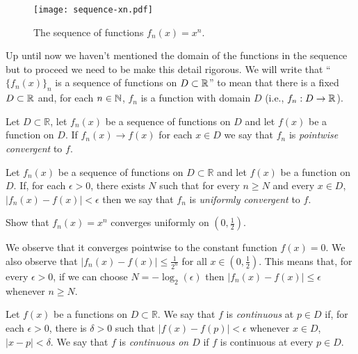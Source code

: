 \begin{figure}
  \begin{center}
    \texttt{[image: sequence-xn.pdf]}
    \caption{The sequence of functions \(f_n(x)= x^n\).}
  \end{center}
\end{figure}

\noindent
Up until now we haven't mentioned the domain of the functions in the sequence but to proceed we need to be make this detail rigorous.
We will write that ``\({\{f_n(x)\}}_{n}\) is a sequence of functions on \(D\subset \mathbb{R}\)'' to mean that there is a fixed \(D\subset \mathbb{R}\) and, for each \(n\in \mathbb{N}\), \(f_{n}\) is a function with domain \(D\) (i.e., \(f_n : D \to \mathbb{R}\)).


\begin{definition}
  Let \(D\subset \mathbb{R}\),
  let \(f_n(x)\) be a sequence of functions on \(D\)
  and let \(f(x)\) be a function on \(D\).
  If \(f_n(x) \to f(x)\) for each \(x\in D\) we say that \(f_n\) is \emph{pointwise convergent} to \(f\).
\end{definition}

\begin{definition}
  Let \(f_n(x)\) be a sequence of functions on \(D\subset \mathbb{R}\)
  and let \(f(x)\) be a function on \(D\).
  If, for each \(\epsilon>0\), there exists \(N\) such that for every \(n\geq N\) and every \(x\in D\), \(|f_n(x) - f(x)| < \epsilon\) then we say that \(f_n\) is \emph{uniformly convergent} to \(f\).
\end{definition}

\begin{example*}
  Show that \(f_n(x) = x^n\) converges uniformly on \((0,\frac{1}{2})\).
\end{example*}

\begin{solution}
  We observe that it converges pointwise to the constant function \(f(x)=0\).
  We also observe that \(|f_n(x) - f(x) | \leq \frac{1}{2^n}\) for all \(x\in (0,\frac{1}{2})\).
  This means that, for every \(\epsilon>0\), if we can choose \(N=-\log_{2}(\epsilon)\) then \(|f_n(x) - f(x) | \leq \epsilon\) whenever \(n\geq N\).
\end{solution}

\begin{definition}
  Let \(f(x)\) be a functions on \(D\subset \mathbb{R}\).
  We say that \(f\) is \emph{continuous} at \(p\in D\) if, for each \(\epsilon>0\), there is \(\delta >0\) such that \(|f(x)-f(p)| <\epsilon\) whenever \(x\in D\), \(|x-p| <\delta\).
  We say that \(f\) is \emph{continuous on \( D\)} if \(f\) is continuous at every \(p\in D\).
\end{definition}

